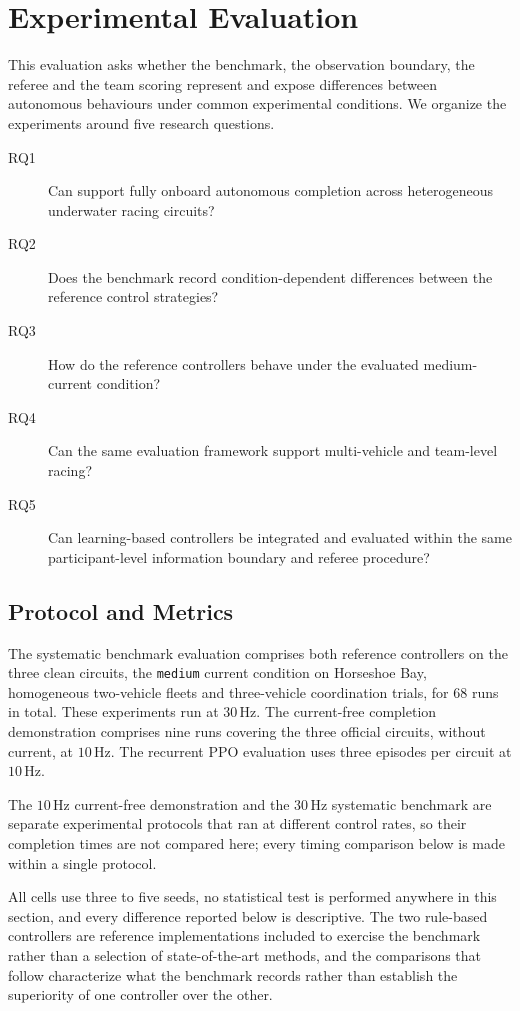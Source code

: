 \section{Experimental Evaluation}
\label{sec:evaluation}

This evaluation asks whether the benchmark, the observation boundary, the referee
and the team scoring represent and expose differences between autonomous
behaviours under common experimental conditions. We organize the experiments
around five research questions.

\begin{description}
\item[RQ1] Can \mra{} support fully onboard autonomous completion across
heterogeneous underwater racing circuits?
\item[RQ2] Does the benchmark record condition-dependent differences between the
reference control strategies?
\item[RQ3] How do the reference controllers behave under the evaluated
medium-current condition?
\item[RQ4] Can the same evaluation framework support multi-vehicle and
team-level racing?
\item[RQ5] Can learning-based controllers be integrated and evaluated within the
same participant-level information boundary and referee procedure?
\end{description}

\subsection{Protocol and Metrics}
\label{sec:eval_protocol}

The systematic benchmark evaluation comprises both reference controllers on the
three clean circuits, the \texttt{medium} current condition on Horseshoe Bay,
homogeneous two-vehicle fleets and three-vehicle coordination trials, for $68$
runs in total. These experiments run at $30$\,Hz. The current-free completion
demonstration comprises
nine runs covering the three official circuits, without current, at $10$\,Hz.
The recurrent PPO evaluation uses three episodes per circuit at $10$\,Hz.

The $10$\,Hz current-free demonstration and the $30$\,Hz systematic benchmark
are separate experimental protocols that ran at different control rates, so
their completion times are not compared here; every timing comparison below is
made within a single protocol.

All cells use three to five seeds, no statistical test is performed anywhere in
this section, and every difference reported below is descriptive. The two
rule-based controllers are reference implementations included to exercise the
benchmark rather than a selection of state-of-the-art methods, and the
comparisons that follow characterize what the benchmark records rather than
establish the superiority of one controller over the other.

